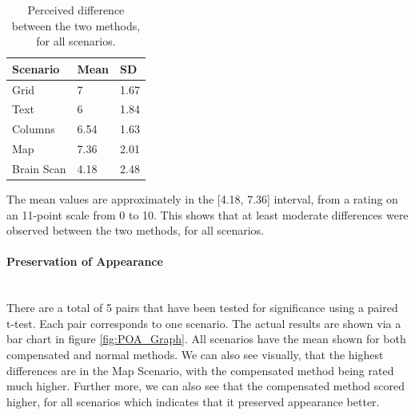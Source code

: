 \documentclass[]{article}
\begin{document}
\begin{table}
\begin{center}
    \begin{tabular}{ | l | l | l |}
    \hline
    Scenario & Mean & SD \\ \hline
    Grid & 7 & 1.67 \\ \hline
    Text & 6 & 1.84 \\ \hline
    Columns & 6.54 & 1.63 \\ \hline
    Map & 7.36 & 2.01 \\ \hline
    Brain Scan & 4.18 &  2.48 \\
    \hline
    \end{tabular}    
    
\end{center}
\caption{Perceived difference between the two methods, for all scenarios.}
\label{table:DifferenceTable}
\end{table}


The mean values are approximately in the [4.18, 7.36] interval, from a rating on an 11-point scale from 0 to 10. This shows that at least moderate differences were observed between the two methods, for all scenarios.

\paragraph{Preservation of Appearance}\mbox{}\\

There are a total of 5 pairs that have been tested for significance using a paired t-test. Each pair corresponds to one scenario. The actual results are shown via a bar chart in figure \ref{fig:POA_Graph}. All scenarios have the mean shown for both compensated and normal methods. We can also see visually, that the highest differences are in the Map Scenario, with the compensated method being rated much higher. Further more, we can also see that the compensated method scored higher, for all scenarios which indicates that it preserved appearance better.
\end{document}
